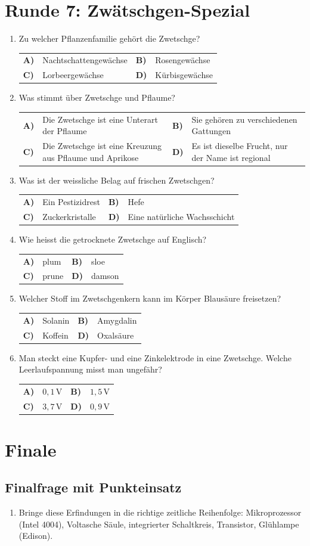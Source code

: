 \documentclass[a4paper,11pt]{article}
\makeatletter
\newif\ifloesung
\newcommand{\loesung}[1]{\ifloesung\par\smallskip\noindent\textcolor{zwetschge}{\textbf{Lösung:} #1}\fi}
\newcommand{\mc}[6]{%
  \item #1\par\nopagebreak\smallskip
  \noindent\begin{tabularx}{\linewidth}{@{}>{\bfseries}l X >{\bfseries}l X@{}}
    A) & #2 & B) & #3 \\[0.25em]
    C) & #4 & D) & #5
  \end{tabularx}%
  \loesung{#6}}
\newcommand{\runde}[2]{\section{Runde #1: #2}}
\makeatother
\begin{document}
\runde{7}{Zwätschgen-Spezial}
\begin{enumerate}
  \mc{Zu welcher Pflanzenfamilie gehört die Zwetschge?}
     {Nachtschattengewächse}{Rosengewächse}{Lorbeergewächse}{Kürbisgewächse}
     {B. Rosengewächse, wie Apfel, Kirsche und Aprikose.}

  \mc{Was stimmt über Zwetschge und Pflaume?}
     {Die Zwetschge ist eine Unterart der Pflaume}{Sie gehören zu verschiedenen Gattungen}{Die Zwetschge ist eine Kreuzung aus Pflaume und Aprikose}{Es ist dieselbe Frucht, nur der Name ist regional}
     {A. \emph{Prunus domestica} subsp.\ \emph{domestica}. Zwetschgen sind länglicher und haben einen leicht lösbaren Stein.}

  \mc{Was ist der weissliche Belag auf frischen Zwetschgen?}
     {Ein Pestizidrest}{Hefe}{Zuckerkristalle}{Eine natürliche Wachsschicht}
     {D. Eine natürliche Wachsschicht, die die Frucht vor dem Austrocknen schützt.}

  \mc{Wie heisst die getrocknete Zwetschge auf Englisch?}
     {plum}{sloe}{prune}{damson}
     {C. Prune. Sloe ist die Schlehe, damson eine Pflaumensorte.}

  \mc{Welcher Stoff im Zwetschgenkern kann im Körper Blausäure freisetzen?}
     {Solanin}{Amygdalin}{Koffein}{Oxalsäure}
     {B. Amygdalin. Solanin steckt in grünen Kartoffeln.}

  \mc{Man steckt eine Kupfer- und eine Zinkelektrode in eine Zwetschge. Welche Leerlaufspannung misst man ungefähr?}
     {$0{,}1\,\mathrm{V}$}{$1{,}5\,\mathrm{V}$}{$3{,}7\,\mathrm{V}$}{$0{,}9\,\mathrm{V}$}
     {D. Etwa $0{,}9$ bis $1\,\mathrm{V}$. Die Spannung kommt vom Elektrodenpaar, nicht von der Frucht. Live-Demo mit Multimeter möglich.}
\end{enumerate}

\section{Finale}
\subsection*{Finalfrage mit Punkteinsatz}
\begin{enumerate}
  \item Bringe diese Erfindungen in die richtige zeitliche Reihenfolge: Mikroprozessor (Intel 4004), Voltasche Säule, integrierter Schaltkreis, Transistor, Glühlampe (Edison).
  \loesung{Voltasche Säule (1800), Glühlampe (1879), Transistor (1947), integrierter Schaltkreis (1958), Mikroprozessor (1971).}
\end{enumerate}
\end{document}
